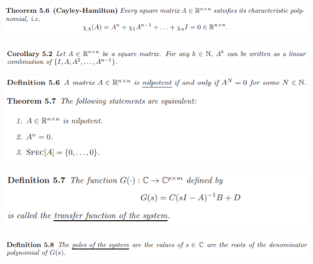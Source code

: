 \documentclass[10pt,landscape]{article}
\newenvironment{Figure}
{\par\medskip\noindent\minipage{\linewidth}}
{\endminipage\par\medskip}
\begin{document}
\begin{multicols*}{4}
\begin{Figure}
	\centering
	\includegraphics[width=\linewidth]{pictures/Th5_6.png}
\end{Figure}

\begin{Figure}
	\centering
	\includegraphics[width=\linewidth]{pictures/Col5_2.png}
\end{Figure}

\begin{Figure}
	\centering
	\includegraphics[width=\linewidth]{pictures/Th5_7.png}
\end{Figure}

\begin{Figure}
	\centering
	\includegraphics[width=\linewidth]{pictures/Def5_7.png}
\end{Figure}

\begin{Figure}
	\centering
	\includegraphics[width=\linewidth]{pictures/Def5_8.png}
\end{Figure}



\end{multicols*}
\end{document}
